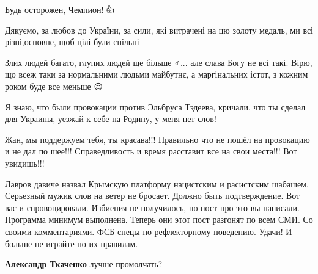 \begin{itemize}
Будь осторожен, Чемпион!💪👍


Дякуємо, за любов до України, за сили, які витрачені на цю золоту медаль, ми всі різні,основне, щоб цілі були спільні

 

Злих людей багато, глупих людей ще більше🤷♂️... але слава Богу не всі такі. Вірю,
що всеж таки за нормальними людьми майбутнє, а маргінальних істот, з кожним
роком буде все меньше 😌🙏


Я знаю, что были провокации против Эльбруса Тэдеева, кричали, что ты сделал
для Украины, уезжай к себе на Родину, у меня нет слов!


Жан, мы поддержуем тебя, ты красава!!! Правильно что не пошёл на провокацию и
не дал по шее!!! Справедливость и время расставит все на свои места!!! Вот
увидишь!!!


Лавров давиче назвал Крымскую платформу нацистским и расистским шабашем.
Серьезный мужик слов на ветер не бросает. Должно быть подтверждение. Вот вас и
спровоцировали. Избиения не получилось, но пост про это вы написали. Программа
минимум выполнена. Теперь они этот пост разгонят по всем СМИ. Со своими
комментариями. ФСБ спецы по рефлекторному поведению. Удачи! И больше не играйте
по их правилам.

\begin{itemize}

 
\textbf{Александр Ткаченко} лучше промолчать?


\end{itemize}
\end{itemize}
